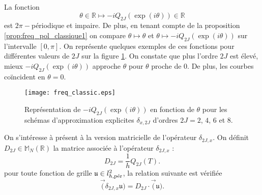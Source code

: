 La fonction
\begin{equation}
\theta \in \mathbb{R} \mapsto - i Q_{2J}(\exp(i \theta)) \in \mathbb{R}
\end{equation}
est $2 \pi -$périodique et impaire. De plus, en tenant compte de la proposition \ref{prop:freq_pol_classique1} on compare $\theta \mapsto \theta$  et $\theta \mapsto - i Q_{2J}(\exp(i \theta))$ sur l'intervalle $[0,\pi]$. On représente quelques exemples de ces fonctions pour différentes valeurs de $2J$ sur la figure \ref{fig:freq_classic}. On constate que plus l'ordre $2J$ est élevé, mieux $- i Q_{2J}(\exp(i \theta))$ approche $\theta$ pour $\theta$ proche de $0$. De plus, les courbes coïncident en $\theta = 0$.

\begin{figure}[htbp]
\begin{center}
\texttt{[image: freq\_classic.eps]}
\end{center}
\caption{Représentation de $-i Q_{2J}\left( \exp(i \theta) \right)$ en fonction de $\theta$ pour les schémas d'approximation explicites $\delta_{x,2J}$ d'ordres $2J = 2$, $4$, $6$ et $8$.}
\label{fig:freq_classic}
\end{figure}

On s'intéresse à présent à la version matricielle de l'opérateur $\delta_{2J,x}$. On définit $D_{2J} \in \mathbb{M}_N(\mathbb{R})$ la matrice associée à l'opérateur $\delta_{2J,x}$ :
\begin{equation}
D_{2J} = \dfrac{1}{h} Q_{2J}(T).
\label{eq:matrice_explicite}
\end{equation}
pour toute fonction de grille $\mathfrak{u} \in l^2_{h,\per}$, la relation suivante est vérifiée
\begin{equation}
\vec(\delta_{2J,x} \mathfrak{u}) = D_{2J} \cdot \vec ( \mathfrak{u} ).
\end{equation}

